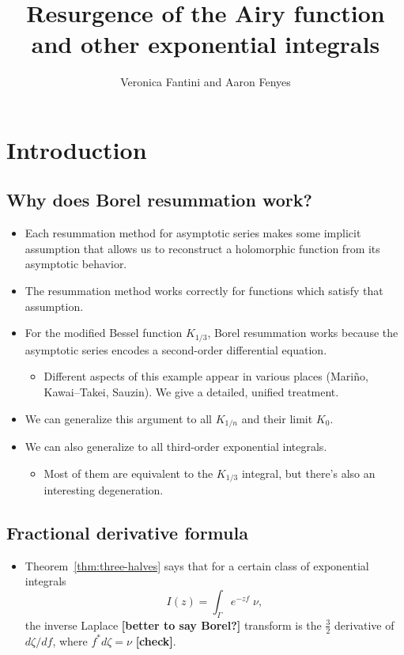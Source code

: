 \documentclass{article}
\title{Resurgence of the Airy function \\ and other exponential integrals}
\author{Veronica Fantini and Aaron Fenyes}
\begin{document}
\maketitle
\section{Introduction}
\subsection{Why does Borel resummation work?}
\begin{itemize}
\item Each resummation method for asymptotic series makes some implicit assumption that allows us to reconstruct a holomorphic function from its asymptotic behavior.
\item The resummation method works correctly for functions which satisfy that assumption.
\item For the modified Bessel function $K_{1/3}$, Borel resummation works because the asymptotic series encodes a second-order differential equation.
\begin{itemize}
\item Different aspects of this example appear in various places (Mari\~{n}o, Kawai--Takei, Sauzin). We give a detailed, unified treatment.
\end{itemize}
\item We can generalize this argument to all $K_{1/n}$ and their limit $K_0$.
\item We can also generalize to all third-order exponential integrals.
\begin{itemize}
\item Most of them are equivalent to the $K_{1/3}$ integral, but there's also an interesting degeneration.
\end{itemize}
\end{itemize}
\subsection{Fractional derivative formula}
\begin{itemize}
\item Theorem~\ref{thm:three-halves} says that for a certain class of exponential integrals
\[ I(z) = \int_\Gamma e^{-zf}\;\nu, \]
the inverse Laplace \textbf{[better to say Borel?]} transform is the $\tfrac{3}{2}$ derivative of $d\zeta/df$, where $f^* d\zeta = \nu$ \textbf{[check]}.
\end{itemize}
\end{document}
